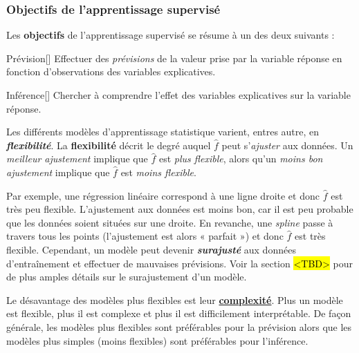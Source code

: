 \documentclass[french]{article}
\begin{document}
\begin{multicols*}{2}
\subsubsection{Objectifs de l'apprentissage supervisé}
Les \textbf{objectifs} de l'apprentissage supervisé se résume à un des deux suivants : 

\begin{definitionGENERAL}{Prévision}[]
Effectuer des \textit{prévisions} de la valeur prise par la variable réponse en fonction d'observations des variables explicatives.
\end{definitionGENERAL}

\begin{definitionGENERAL}{Inférence}[]
Chercher à comprendre l'effet des variables explicatives sur la variable réponse.
\end{definitionGENERAL}


\bigskip

Les différents modèles d'apprentissage statistique varient, entres autre, en \textbf{\textit{flexibilité}}. La \textbf{flexibilité} décrit le degré auquel $\hat{f}$ peut s'\textit{ajuster} aux données. Un \textit{meilleur ajustement} implique que $\hat{f}$ est \textit{plus flexible}, alors qu'un \textit{moins bon ajustement} implique que $\hat{f}$ est \textit{moins flexible}.

\bigskip

Par exemple, une régression linéaire correspond à une ligne droite et donc $\hat{f}$ est très peu flexible. L'ajustement aux données est moins bon, car il est peu probable que les données soient situées sur une droite. En revanche, une \og \textit{spline} \fg{} passe à travers tous les points (l'ajustement est alors « parfait ») et donc $\hat{f}$ est très flexible. Cependant, un modèle peut devenir \textbf{\textit{surajusté}} aux données d'entraînement et effectuer de mauvaises prévisions. Voir la section \hl{<TBD>} pour de plus amples détails sur le surajustement d'un modèle.

\bigskip

Le désavantage des modèles plus flexibles est leur \textbf{\underline{complexité}}. Plus un modèle est flexible, plus il est complexe et plus il est difficilement interprétable. De façon générale, les modèles plus flexibles sont préférables pour la prévision alors que les modèles plus simples (moins flexibles) sont préférables pour l'inférence.



\columnbreak

\end{multicols*}
\end{document}

